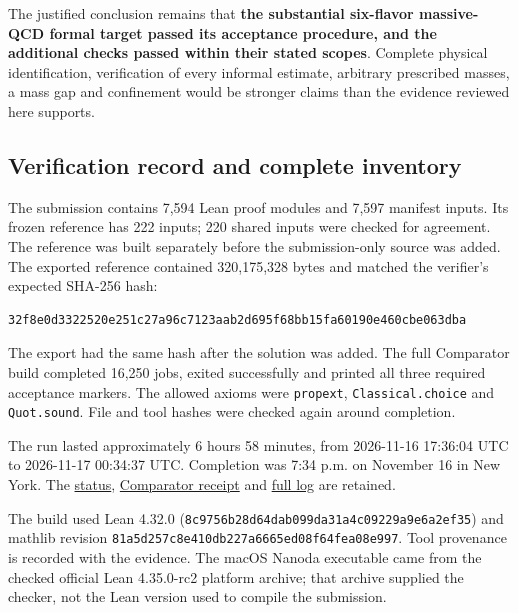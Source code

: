\documentclass[
  11pt,
]{article}
\begin{document}
The justified conclusion remains that \textbf{the substantial six-flavor
massive-QCD formal target passed its acceptance procedure, and the
additional checks passed within their stated scopes}. Complete physical
identification, verification of every informal estimate, arbitrary
prescribed masses, a mass gap and confinement would be stronger claims
than the evidence reviewed here supports.

\subsection{Verification record and complete
inventory}\label{verification-record-and-complete-inventory}

The submission contains 7,594 Lean proof modules and 7,597 manifest
inputs. Its frozen reference has 222 inputs; 220 shared inputs were
checked for agreement. The reference was built separately before the
submission-only source was added. The exported reference contained
320,175,328 bytes and matched the verifier's expected SHA-256 hash:

\begin{verbatim}
32f8e0d3322520e251c27a96c7123aab2d695f68bb15fa60190e460cbe063dba
\end{verbatim}

The export had the same hash after the solution was added. The full
Comparator build completed 16,250 jobs, exited successfully and printed
all three required acceptance markers. The allowed axioms were
{\small \nolinkurl{propext}}, {\small \nolinkurl{Classical.choice}} and
{\small \nolinkurl{Quot.sound}}. File and tool hashes were checked again
around completion.

The run lasted approximately 6 hours 58 minutes, from 2026-11-16
17:36:04 UTC to 2026-11-17 00:34:37 UTC. Completion was 7:34 p.m. on
November 16 in New York. The
\href{https://github.com/yang-mills-group/QCD/blob/main/evidence/supplied-target/status.json}{status},
\href{https://github.com/yang-mills-group/QCD/blob/main/evidence/supplied-target/comparator.json}{Comparator
receipt} and
\href{https://github.com/yang-mills-group/QCD/blob/main/evidence/supplied-target/comparator.log}{full
log} are retained.

The build used Lean 4.32.0
({\small \nolinkurl{8c9756b28d64dab099da31a4c09229a9e6a2ef35}}) and
mathlib revision
{\small \nolinkurl{81a5d257c8e410db227a6665ed08f64fea08e997}}. Tool
provenance is recorded with the evidence. The macOS Nanoda executable
came from the checked official Lean 4.35.0-rc2 platform archive; that
archive supplied the checker, not the Lean version used to compile the
submission.
\end{document}
